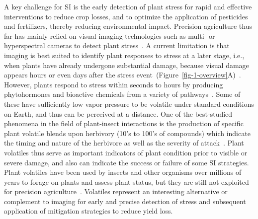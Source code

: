 A key challenge for SI is the early detection of plant stress for rapid and effective interventions to reduce crop losses, and to optimize the application of pesticides and fertilizers, thereby reducing environmental impact. Precision agriculture thus far has mainly relied on visual imaging technologies such as multi- or hyperspectral cameras to detect plant stress~\cite{Tsouros2019, Toth2016, Singh2020}. A current limitation is that imaging is best suited to identify plant responses to stress at a later stage, i.e., when plants have already undergone substantial damage, because visual damage appears hours or even days after the stress event~(Figure~\ref{fig-1-overview}A)~\cite{mahlein_hyperspectral_2018}. However, plants respond to stress within seconds to hours by producing phytohormones and bioactive chemicals from a variety of pathways~\cite{schuman_layers_2016}. Some of these have sufficiently low vapor pressure to be volatile under standard conditions on Earth, and thus can be perceived at a distance. One of the best-studied phenomena in the field of plant-insect interactions is the production of specific plant volatile blends upon herbivory (10's to 100's of compounds) which indicate the timing and nature of the herbivore as well as the severity of attack~\cite{howe_plant_2008, dicke_evolutionary_2010}. Plant volatiles thus serve as important indicators of plant condition prior to visible or severe damage, and also can indicate the success or failure of some SI strategies. Plant volatiles have been used by insects and other organisms over millions of years to forage on plants and assess plant status, but they are still not exploited for precision agriculture~\cite{turlings_tritrophic_2018}. Volatiles represent an interesting alternative or complement to imaging for early and precise detection of stress and subsequent application of mitigation strategies to reduce yield loss.

